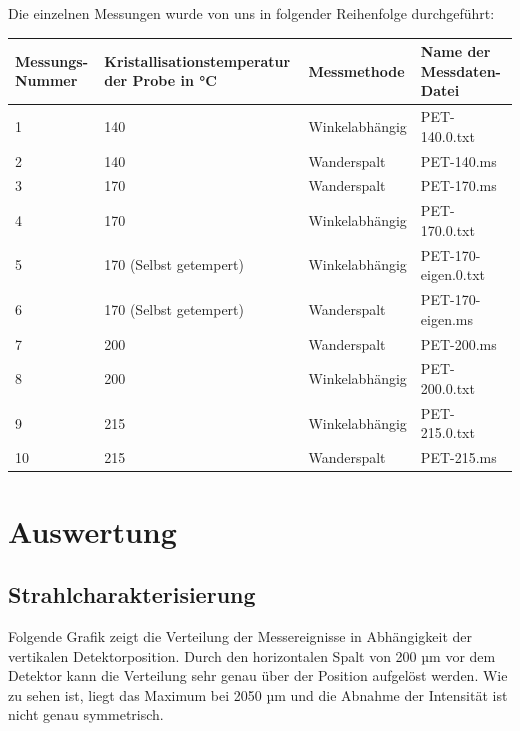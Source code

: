 \documentclass[bigchapter,colorback,accentcolor=tud4b,linedtoc,11pt]{tudreport}
\begin{document}
Die einzelnen Messungen wurde von uns in folgender Reihenfolge durchgeführt:


\begin{center}
  \begin{tabular}{|p{2.2cm}|p{4.5cm}|p{3cm}|p{4cm}|}
    \hline
    Messungs-Nummer & Kristallisationstemperatur der Probe in °C & Messmethode    & Name der Messdaten-Datei \\ \hline
    1               & 140                                        & Winkelabhängig & PET-140.0.txt \\ \hline
    2               & 140                                        & Wanderspalt    & PET-140.ms \\ \hline
    3               & 170                                        & Wanderspalt    & PET-170.ms \\ \hline
    4               & 170                                        & Winkelabhängig & PET-170.0.txt \\ \hline
    5               & 170 (Selbst getempert)                     & Winkelabhängig & PET-170-eigen.0.txt \\ \hline
    6               & 170 (Selbst getempert)                     & Wanderspalt    & PET-170-eigen.ms \\ \hline
    7               & 200                                        & Wanderspalt    & PET-200.ms \\ \hline
    8               & 200                                        & Winkelabhängig & PET-200.0.txt \\ \hline
    9               & 215                                        & Winkelabhängig & PET-215.0.txt \\ \hline
    10              & 215                                        & Wanderspalt    & PET-215.ms \\ \hline
	\end{tabular}
\end{center}

\chapter{Auswertung}
\section{Strahlcharakterisierung}

Folgende Grafik zeigt die Verteilung der Messereignisse in Abhängigkeit der vertikalen Detektorposition. Durch den horizontalen Spalt von 200 µm vor dem Detektor kann die Verteilung sehr genau über der Position aufgelöst werden. Wie zu sehen ist, liegt das Maximum bei 2050 µm und die Abnahme der Intensität ist nicht genau symmetrisch.
\end{document}
